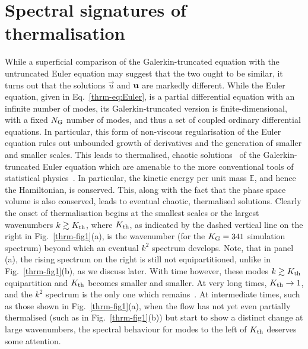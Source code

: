 \documentclass[../Rajarshi-thesis-draft.tex]{subfiles}
\begin{document}
\section{Spectral signatures of thermalisation}
While a superficial comparison of the Galerkin-truncated equation with the
untruncated Euler equation may suggest that the two ought to be similar, it
turns out that the solutions $\vec{u}$ and ${\bf u}$ are markedly different.
While the Euler equation, given in Eq.~\eqref{thrm-eq:Euler}, is a partial
differential equation with an infinite number of modes, its Galerkin-truncated
version is finite-dimensional, with a fixed $N_{\rm G}$ number of modes{, and
thus a set of coupled ordinary differential equations}.  In particular, this form
of non-viscous regularisation of the Euler equation rules out unbounded growth
of derivatives and the generation of smaller and smaller scales. This leads to
thermalised, chaotic  solutions~\cite{Cichowlasetal2005,Muruganetal2021} of the
Galerkin-truncated Euler equation which are amenable to the more conventional tools of
statistical
physics~\cite{Kraichnan1967,Kraichnan1973,Orszag1977,KraichnanChen1989}.  In
particular, the kinetic energy {per unit mass} {$\mathbb{E}$}, and
hence the Hamiltonian, is conserved. This, along with the fact that the phase
space volume is also conserved, leads to eventual chaotic, thermalised
solutions.  Clearly the onset of thermalisation begins at the smallest scales
or the largest wavenumbers $k \gtrsim K_{\rm th}$, where $K_{\rm th}$, as
indicated by the dashed vertical line on the right in
Fig.~\ref{thrm-fig1}(a), is the wavenumber (for the $K_{\rm G} = 341$
simulation spectrum) beyond which an eventual $k^2$ spectrum develops. Note,
that in panel (a), the rising spectrum on the right is still not
equipartitioned, unlike in Fig.~\ref{thrm-fig1}(b), as we discuss later. With
time however, these modes $k \gtrsim K_{\rm th}$ equipartition and $K_{\rm
th}$ becomes smaller and smaller. At very long times, $K_{\rm th} \to 1$,
and the $k^2$ spectrum is the only one which remains~\cite{Cichowlasetal2005}.
At intermediate times, such as those shown in Fig.~\ref{thrm-fig1}(a),
when the flow has not yet even partially thermalised (such as in Fig.~\ref{thrm-fig1}(b)) but start to
show a distinct change at large wavenumbers, the spectral behaviour for modes to the left of
$K_{\rm th}$ deserves some attention.
\end{document}
